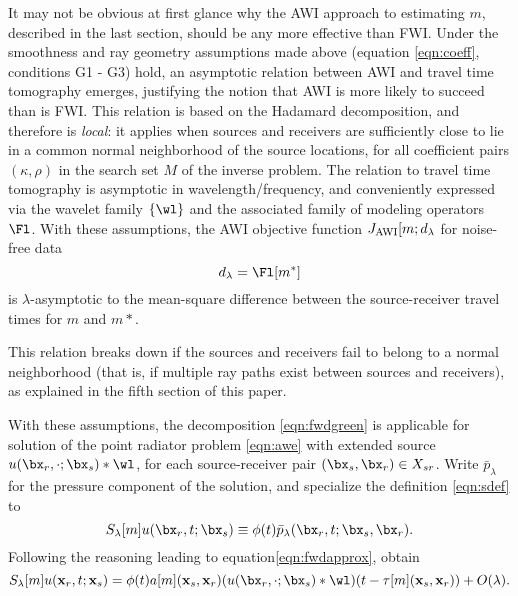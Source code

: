 It may not be obvious at first glance why the AWI approach to estimating
$m$, described in the last section, should be any more effective than
FWI. Under the smoothness and ray geometry assumptions made above (equation
\ref{eqn:coeff}, conditions G1 - G3) hold, an asymptotic relation
between AWI and travel time tomography emerges, justifying the notion
that AWI is more likely to succeed than is FWI. This relation is based
on the Hadamard decomposition, and therefore is {\em
  local}: it applies when sources and receivers are sufficiently
close to lie in a common normal neighborhood of the source locations,
for all coefficient pairs $(\kappa,\rho)$ in the search set $M$ of the
inverse problem. The relation to travel time tomography is asymptotic
in wavelength/frequency, and conveniently expressed via the wavelet
family $\{\wl\}$ and the associated family of modeling operators
$\Fl$. With these assumptions, the AWI objective function $J_{\rm AWI}[m;d_{\lambda}$
for noise-free data
\begin{equation}
  \label{eqn:noisefree}
  d_{\lambda}=\Fl[m^*]
\end{equation}
is $\lambda$-asymptotic to the mean-square difference between the
source-receiver travel times for $m$ and $m*$. 

This relation breaks down if the sources and receivers fail to belong
to a normal neighborhood (that is, if multiple ray paths exist between
sources and receivers), as explained in the fifth section of this paper.

With these assumptions,
the decomposition \ref{eqn:fwdgreen} is applicable for solution of the point
radiator problem \ref{eqn:awe} with extended source
$u(\bx_r,\cdot;\bx_s)*\wl$, for each source-receiver pair
$(\bx_s,\bx_r)\in X_{sr}$. Write $\bar{p}_{\lambda}$ for the pressure
component of the solution, and specialize the definition
\ref{eqn:sdef} to
\begin{equation}
  \label{eqn:sdeflam}
  S_{\lambda}[m]u(\bx_r,t;\bx_s) \equiv \phi(t)\bar{p}_{\lambda}(\bx_r,t;\bx_s,\bx_r).
\end{equation}
Following the reasoning leading to
equation\ref{eqn:fwdapprox}, obtain
\begin{equation}
  \label{eqn:slamapprox}
  S_{\lambda}[m]u({\bf x}_r,t;{\bf x}_s) = \phi(t)a[m]({\bf x}_s,{\bf
    x}_r) (u(\bx_r,\cdot;\bx_s)*\wl)(t-\tau[m]({\bf x}_s,{\bf x}_r)) + O(\lambda).
\end{equation}

